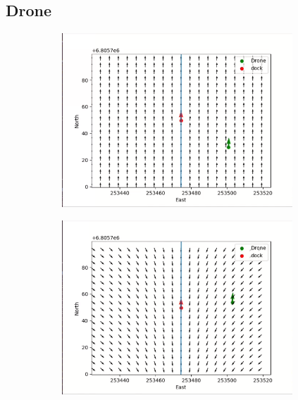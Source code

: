 \documentclass[12pt]{report}
\begin{document}
\subsection{Drone}

\begin{figure}[H]
  \centering
  \begin{subfigure}{0.45\textwidth}
    \centering
    \includegraphics[width=0.95\textwidth]{imgs/drone_exp1_1.png}
    \caption{}
  \end{subfigure}
  \begin{subfigure}{0.45\textwidth}
    \centering
    \includegraphics[width=0.95\textwidth]{imgs/drone_exp1_2.png}
    \caption{}
  \end{subfigure}


\end{figure}
\end{document}
